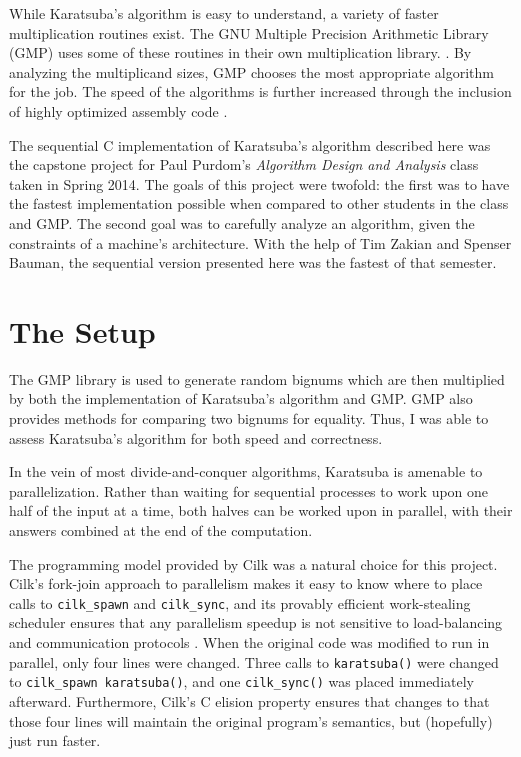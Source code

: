 \documentclass[8pt, twocolumn]{article}
\begin{document}
While Karatsuba's algorithm is easy to understand, a variety of faster
multiplication routines exist. The GNU Multiple Precision Arithmetic Library
(GMP) uses some of these routines in their own multiplication library.
\cite{gmp-mult}. By analyzing the multiplicand sizes, GMP chooses the most
appropriate algorithm for the job.  The speed of the algorithms is
further increased through the inclusion of highly optimized assembly code
\cite{gmp-home}.

The sequential C implementation of Karatsuba's algorithm described here was the
capstone project for Paul Purdom's \textit{Algorithm Design and Analysis} class
taken in Spring 2014.  The goals of this project were twofold: the first was to
have the fastest implementation possible when compared to other students in the
class and GMP.  The second goal was to carefully analyze an algorithm, given the
constraints of a machine's architecture.  With the help of Tim Zakian and
Spenser Bauman, the sequential version presented here was the fastest of that
semester.

\section{The Setup}
The GMP library is used to generate random bignums which are then multiplied by
both the implementation of Karatsuba's algorithm and GMP. GMP also provides
methods for comparing two bignums for equality. Thus, I was able to assess
Karatsuba's algorithm for both speed and correctness.

In the vein of most divide-and-conquer algorithms, Karatsuba is amenable to
parallelization.  Rather than waiting for sequential processes to work upon one
half of the input at a time, both halves can be worked upon in parallel, with
their answers combined at the end of the computation.

The programming model provided by Cilk was a natural choice for this project.
Cilk's fork-join approach to parallelism makes it easy to know where to place
calls to \texttt{cilk\_spawn} and \texttt{cilk\_sync}, and its provably
efficient work-stealing scheduler ensures that any parallelism speedup is not
sensitive to load-balancing and communication protocols \cite{leiserson}.  When
the original code was modified to run in parallel, only four lines were changed.
Three calls to \texttt{karatsuba()} were changed to \texttt{cilk\_spawn
karatsuba()}, and one \texttt{cilk\_sync()} was placed immediately afterward.
Furthermore, Cilk's C elision property ensures that changes to that those four
lines will maintain the original program's semantics, but (hopefully) just run
faster.
\end{document}
